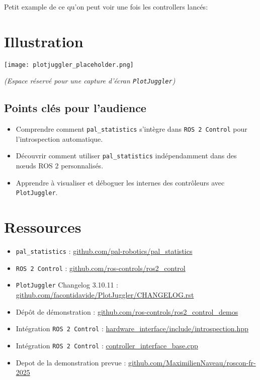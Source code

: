 \documentclass[11pt,a4paper]{article}
\begin{document}
Petit example de ce qu'on peut voir une fois les controllers lancés:
\section*{Illustration}
\begin{center}
\texttt{[image: plotjuggler\_placeholder.png]}
\end{center}
\textit{(Espace réservé pour une capture d'écran \texttt{PlotJuggler})}

\subsection*{Points clés pour l'audience}

\begin{itemize}
    \item Comprendre comment \texttt{pal\_statistics} s'intègre dans
          \texttt{ROS 2 Control} pour l'introspection automatique.
    \item Découvrir comment utiliser \texttt{pal\_statistics} indépendamment
    dans des nœuds ROS 2 personnalisés.
    \item Apprendre à visualiser et déboguer les internes des contrôleurs avec
          \texttt{PlotJuggler}.
\end{itemize}

\section*{Ressources}
\begin{itemize}
    \item \texttt{pal\_statistics} :
    \href{https://github.com/pal-robotics/pal_statistics}{github.com/pal-robotics/pal\_statistics}
    \item \texttt{ROS 2 Control} :
    \href{https://github.com/ros-controls/ros2_control}{github.com/ros-controls/ros2\_control}
    \item \texttt{PlotJuggler} Changelog 3.10.11 :
    \href{https://github.com/facontidavide/PlotJuggler/blob/main/CHANGELOG.rst}{github.com/facontidavide/PlotJuggler/CHANGELOG.rst}
    \item Dépôt de démonstration :
    \href{https://github.com/ros-controls/ros2_control_demos}{github.com/ros-controls/ros2\_control\_demos}
    \item Intégration \texttt{ROS 2 Control} :
    \href{https://github.com/ros-controls/ros2_control/blob/master/hardware_interface/include/hardware_interface/introspection.hpp}{hardware\_interface/include/introspection.hpp}
    \item Intégration \texttt{ROS 2 Control} :
    \href{https://github.com/ros-controls/ros2_control/blob/master/controller_interface/src/controller_interface_base.cpp#L180C3-L180C38}{controller\_interface\_base.cpp}
    \item Depot de la demonstration prevue :
    \href{https://github.com/MaximilienNaveau/roscon-fr-2025}{github.com/MaximilienNaveau/roscon-fr-2025}
\end{itemize}
\end{document}
